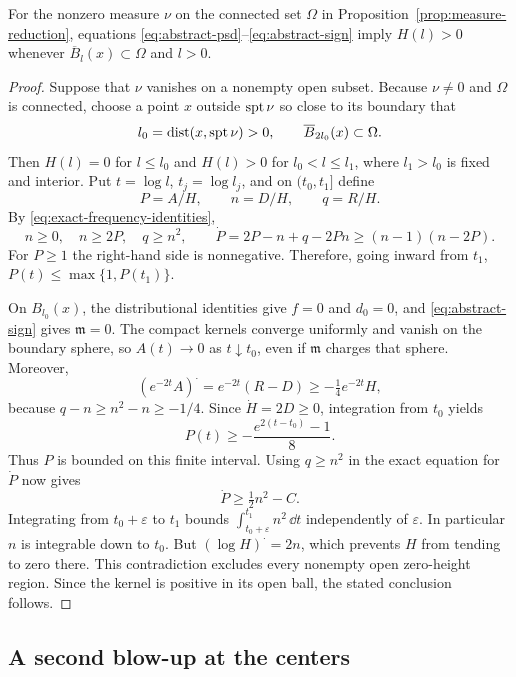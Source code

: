\begin{lemma}
\label{lem:positive-limit-height}
For the nonzero measure $\nu$ on the connected set $\Omega$ in
Proposition~\ref{prop:measure-reduction}, equations
\eqref{eq:abstract-psd}--\eqref{eq:abstract-sign} imply $H(l)>0$
whenever $\overline B_l(x)\subset\Omega$ and $l>0$.
\end{lemma}

\begin{proof}
Suppose that $\nu$ vanishes on a nonempty open subset. Because
$\nu\ne0$ and $\Omega$ is connected, choose a point $x$ outside
$\operatorname{spt}\nu$ so close to its boundary that
\[
 l_0=\operatorname{dist}(x,\operatorname{spt}\nu)>0,
 \qquad \overline B_{2l_0}(x)\subset\Omega.
\]
Then $H(l)=0$ for $l\le l_0$ and $H(l)>0$ for
$l_0<l\le l_1$, where $l_1>l_0$ is fixed and interior. Put
$t=\log l$, $t_j=\log l_j$, and on $(t_0,t_1]$ define
\[
 P=A/H,\qquad n=D/H,\qquad q=R/H.
\]
By \eqref{eq:exact-frequency-identities},
\begin{equation}
 \label{eq:finite-radius-frequency}
 n\ge0,\quad n\ge2P,\quad q\ge n^2,\qquad
 \dot P=2P-n+q-2Pn
       \ge(n-1)(n-2P).
\end{equation}
For $P\ge1$ the right-hand side is nonnegative. Therefore, going
inward from $t_1$,
$P(t)\le\max\{1,P(t_1)\}$.

On $B_{l_0}(x)$, the distributional identities give $f=0$ and
$d_0=0$, and \eqref{eq:abstract-sign} gives $\mathfrak m=0$.
The compact kernels converge uniformly and vanish on the boundary
sphere, so $A(t)\to0$ as $t\downarrow t_0$, even if
$\mathfrak m$ charges that sphere. Moreover,
\[
 (e^{-2t}A)^{\displaystyle\cdot}
   =e^{-2t}(R-D)\ge-\tfrac14e^{-2t}H,
\]
because $q-n\ge n^2-n\ge-1/4$. Since $\dot H=2D\ge0$,
integration from $t_0$ yields
\[
 P(t)\ge-\frac{e^{2(t-t_0)}-1}{8}.
\]
Thus $P$ is bounded on this finite interval. Using $q\ge n^2$ in
the exact equation for $\dot P$ now gives
\[
 \dot P\ge\tfrac12 n^2-C.
\]
Integrating from $t_0+\varepsilon$ to $t_1$ bounds
$\int_{t_0+\varepsilon}^{t_1}n^2\,\dd t$ independently of
$\varepsilon$. In particular $n$ is integrable down to $t_0$.
But $(\log H)^{\displaystyle\cdot}=2n$, which prevents $H$ from
tending to zero there. This contradiction excludes every nonempty
open zero-height region. Since the kernel is positive in its open
ball, the stated conclusion follows.
\end{proof}

\subsection{A second blow-up at the centers}

